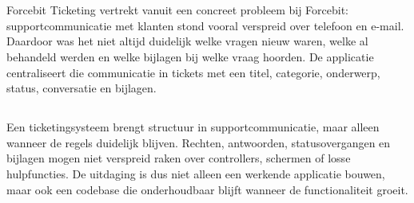 ﻿%

\chapter{}%
\label{ch:inleiding}

%

Forcebit Ticketing vertrekt vanuit een concreet probleem bij Forcebit: supportcommunicatie met klanten stond vooral verspreid over telefoon en e-mail. Daardoor was het niet altijd duidelijk welke vragen nieuw waren, welke al behandeld werden en welke bijlagen bij welke vraag hoorden. De applicatie centraliseert die communicatie in tickets met een titel, categorie, onderwerp, status, conversatie en bijlagen.

\section{}%
\label{sec:probleemstelling}


Een ticketingsysteem brengt structuur in supportcommunicatie, maar alleen wanneer de regels duidelijk blijven. Rechten, antwoorden, statusovergangen en bijlagen mogen niet verspreid raken over controllers, schermen of losse hulpfuncties. De uitdaging is dus niet alleen een werkende applicatie bouwen, maar ook een codebase die onderhoudbaar blijft wanneer de functionaliteit groeit.

